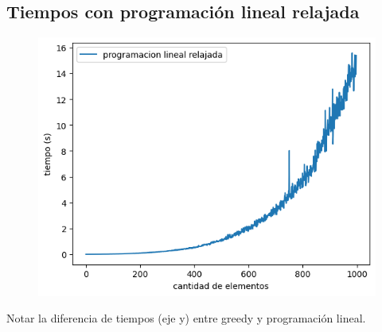 \subsection{Tiempos con programación lineal relajada}

\begin{figure}[H]
    \centering
    \includegraphics[width=1\textwidth]{img/pl_rlx.png}
\end{figure}

Notar la diferencia de tiempos (eje y) entre greedy y programación lineal.